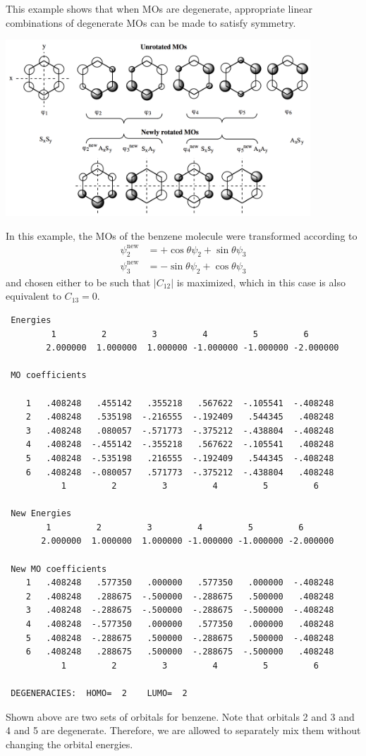 \documentclass[../Main/chem532-notes.tex]{subfiles}
\begin{document}
\begin{example}
This example shows that when MOs are degenerate, appropriate linear combinations of degenerate MOs can be made to satisfy symmetry.

\includegraphics[width=4.5in]{../huckel/c2_symmetry_ex3.png}

In this example, the MOs of the benzene molecule were transformed according to
\begin{align*}
\psi_2^\mathrm{new} & = +\cos \theta \psi_2 + \sin \theta \psi_3  \\
\psi_3^\mathrm{new} & = -\sin \theta \psi_2 + \cos \theta \psi_3 
\end{align*}
and chosen either to be such that $|C_{12}|$ is maximized, which in this case is also equivalent to $C_{13} = 0$.
\begin{verbatim}
 Energies
         1         2         3         4         5         6
        2.000000  1.000000  1.000000 -1.000000 -1.000000 -2.000000

 MO coefficients

    1   .408248   .455142   .355218   .567622  -.105541  -.408248
    2   .408248   .535198  -.216555  -.192409   .544345   .408248
    3   .408248   .080057  -.571773  -.375212  -.438804  -.408248
    4   .408248  -.455142  -.355218   .567622  -.105541   .408248
    5   .408248  -.535198   .216555  -.192409   .544345  -.408248
    6   .408248  -.080057   .571773  -.375212  -.438804   .408248
           1         2         3         4         5         6

 New Energies
        1         2         3         4         5         6
       2.000000  1.000000  1.000000 -1.000000 -1.000000 -2.000000

 New MO coefficients
    1   .408248   .577350   .000000   .577350   .000000  -.408248
    2   .408248   .288675  -.500000  -.288675   .500000   .408248
    3   .408248  -.288675  -.500000  -.288675  -.500000  -.408248
    4   .408248  -.577350   .000000   .577350   .000000   .408248
    5   .408248  -.288675   .500000  -.288675   .500000  -.408248
    6   .408248   .288675   .500000  -.288675  -.500000   .408248
           1         2         3         4         5         6

 DEGENERACIES:  HOMO=  2    LUMO=  2
\end{verbatim}
Shown above are two sets of orbitals for benzene. Note that orbitals 2 and 3 and 4 and 5 are degenerate. Therefore, we are allowed to separately mix them without changing the orbital energies.
\end{example}
\end{document}
